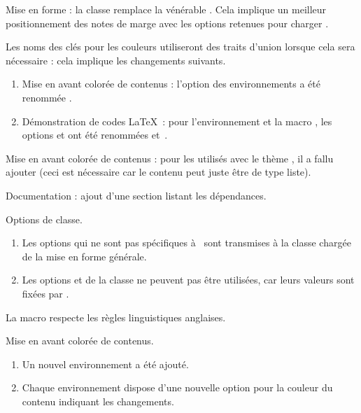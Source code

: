 \documentclass{tutodoc}
\begin{document}
\begin{tdocbreak}
	\item Mise en forme : la classe  remplace la vénérable . Cela implique un meilleur positionnement des notes de marge avec les options retenues pour charger .


	\item Les noms des clés pour les couleurs utiliseront des traits d'union lorsque cela sera nécessaire : cela implique les changements suivants.
	\begin{enumerate}
		\item Mise en avant colorée de contenus : l'option  des environnements a été renommée .

		\item Démonstration de codes \LaTeX\ : pour l'environnement  et la macro , les options  et  ont été renommées  et \,.
	\end{enumerate}
\end{tdocbreak}


\begin{tdocfix}
	\item Mise en avant colorée de contenus : pour les  utilisés avec le thème , il a fallu ajouter  (ceci est nécessaire car le contenu peut juste être de type liste).
\end{tdocfix}


\begin{tdocnew}
	\item Documentation : ajout d'une section listant les dépendances.

	\item Options de classe.
	\begin{enumerate}
		\item Les options qui ne sont pas spécifiques à \thisproj\ sont transmises à la classe chargée de la mise en forme générale.

		\item Les options  et  de la classe  ne peuvent pas être utilisées, car leurs valeurs sont fixées par \thisproj.
	\end{enumerate}

	\item La macro  respecte les règles linguistiques anglaises.

	\item Mise en avant colorée de contenus.
	\begin{enumerate}
		\item Un nouvel environnement  a été ajouté.

		\item Chaque environnement dispose d'une nouvelle option  pour la couleur du contenu indiquant les changements.
	\end{enumerate}
\end{tdocnew}
\end{document}
